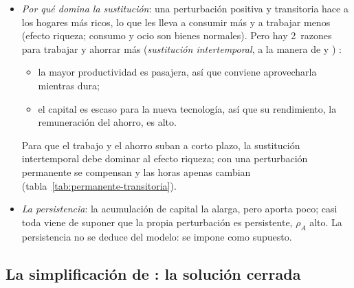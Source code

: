 \documentclass[11pt]{article}
\begin{document}
\begin{itemize}
\item \emph{Por qué domina la sustitución}\nocite{Romer2019Advanced}: una perturbación positiva y transitoria hace a los hogares más ricos, lo que les lleva a consumir más y a trabajar menos (efecto riqueza; consumo y ocio son bienes normales). Pero hay 2~razones para trabajar y ahorrar más (\emph{sustitución intertemporal}, a la manera de  y ) :
  \begin{itemize}
  \item la mayor productividad es pasajera, así que conviene aprovecharla mientras dura;
  \item el capital es escaso para la nueva tecnología, así que su rendimiento, la remuneración del ahorro, es alto.
  \end{itemize}
  Para que el trabajo y el ahorro suban a corto plazo, la sustitución intertemporal debe dominar al efecto riqueza; con una perturbación permanente se compensan y las horas apenas cambian (tabla~\ref{tab:permanente-transitoria}).
\item \emph{La persistencia}: la acumulación de capital la alarga, pero aporta poco\nocite{CogleyNason1995Output}; casi toda viene de suponer que la propia perturbación es persistente, $\rho_A$ alto. La persistencia no se deduce del modelo: se impone como supuesto.
\end{itemize}



\subsection{La simplificación de : la solución cerrada}
\end{document}
